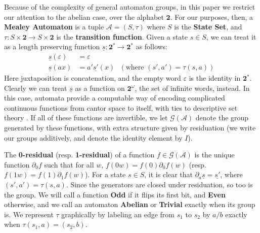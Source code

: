 \documentclass[runningheads]{llncs}
\newcommand{\A}{\mathcal{A}}
\newcommand{\G}{\mathcal{G}}
\newcommand{\2}{\textbf{2}}
\newcommand{\del}{\partial}
\begin{document}
\begin{center}
\end{center}

Because of the complexity of general automaton groups, in this paper we
restrict our attention to the abelian case, over the alphabet $\2$. 
For our purposes, then, a \textbf{Mealey Automaton} is a tuple $\A = (S, \tau)$
where $S$ is the \textbf{State Set}, and $\tau : S \times \2 \to S \times \2$ 
is the \textbf{transition function}. 
Given a state $s \in S$, we can treat it as a length preserving function 
$\underline{s} : \2^* \to \2^*$ as follows:
\begin{align*}
  \underline{s}(\varepsilon) &= \varepsilon\\
  \underline{s}(ax)       &= a' \underline{s'}(x) 
  ~~~(\text{where } (s', a') = \tau(s,a))
\end{align*}
Here juxtaposition is concatenation, and the empty word $\varepsilon$ is
the identity in $\2^*$. Clearly we can treat 
$\underline{s}$ as a function on $\2^\omega$, the set of infinite words, 
instead. In this case, automata provide a computable way of encoding 
complicated continuous functions from cantor space to itself, with ties to
descriptive set theory \cite{skrzypczak15:descriptive}.
If all of these functions are invertible, we let $\G(\A)$ denote
the group generated by these functions, with extra structure given by 
residuation (we write our groups additively, and denote the identity 
element by $I$). 

The \textbf{0-residual} (resp. \textbf{1-residual}) of a 
function $f \in \G(\A)$ is the unique function 
$\del_0 f$ such that for all $w$, $f(0w) = f(0) \del_0 f(w)$ 
(resp. $f(1w) = f(1) \del_1 f(w)$). 
For a state $s \in S$, it is clear that 
$\del_a \underline{s} = \underline{s'}$, where $(s',a') = \tau(s,a)$.
Since the generators are closed under residuation, so too is the group.
We will call a function \textbf{Odd} if it flips its first bit, and 
\textbf{Even} otherwise, and we call an automaton \textbf{Abelian} or \textbf{Trivial}
exactly when its group is. We represent $\tau$ graphically by labeling an
edge from $s_1$ to $s_2$ by $a/b$ exactly when $\tau(s_1,a) = (s_2,b)$.
\end{document}
